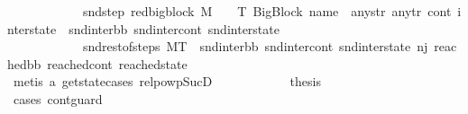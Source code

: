 \begin{isabellebody}
\ \ \ \ \ \ \ \ \ \ \ \ snd{\isacharunderscore}{\kern0pt}step{\isacharcolon}{\kern0pt}\ {\isachardoublequoteopen}red{\isacharunderscore}{\kern0pt}bigblock\ M\ {\isasymLambda}\ {\isasymGamma}\ {\isasymOmega}\ T\ {\isacharparenleft}{\kern0pt}{\isacharparenleft}{\kern0pt}BigBlock\ name\ {\isacharbrackleft}{\kern0pt}{\isacharbrackright}{\kern0pt}\ any{\isacharunderscore}{\kern0pt}str\ any{\isacharunderscore}{\kern0pt}tr{\isacharparenright}{\kern0pt}{\isacharcomma}{\kern0pt}\ cont{}{\isacharcomma}{\kern0pt}\ inter{\isacharunderscore}{\kern0pt}state{\isacharparenright}{\kern0pt}\ \ {\isacharparenleft}{\kern0pt}snd{\isacharunderscore}{\kern0pt}inter{\isacharunderscore}{\kern0pt}bb{\isacharcomma}{\kern0pt}\ snd{\isacharunderscore}{\kern0pt}inter{\isacharunderscore}{\kern0pt}cont{\isacharcomma}{\kern0pt}\ snd{\isacharunderscore}{\kern0pt}inter{\isacharunderscore}{\kern0pt}state{\isacharparenright}{\kern0pt}{\isachardoublequoteclose}\ \isanewline
\ \ \ \ \ \ \ \ \ \ \ \ snd{\isacharunderscore}{\kern0pt}rest{\isacharunderscore}{\kern0pt}of{\isacharunderscore}{\kern0pt}steps{\isacharcolon}{\kern0pt}\ {\isachardoublequoteopen}M{\isacharcomma}{\kern0pt}{\isasymLambda}{\isacharcomma}{\kern0pt}{\isasymGamma}{\isacharcomma}{\kern0pt}{\isasymOmega}{\isacharcomma}{\kern0pt}T\ {\isasymturnstile}\ {\isacharparenleft}{\kern0pt}snd{\isacharunderscore}{\kern0pt}inter{\isacharunderscore}{\kern0pt}bb{\isacharcomma}{\kern0pt}\ snd{\isacharunderscore}{\kern0pt}inter{\isacharunderscore}{\kern0pt}cont{\isacharcomma}{\kern0pt}\ snd{\isacharunderscore}{\kern0pt}inter{\isacharunderscore}{\kern0pt}state{\isacharparenright}{\kern0pt}\ {\isacharminus}{\kern0pt}n{\isasymlongrightarrow}{\isacharcircum}{\kern0pt}j{\isacharprime}{\kern0pt}{\isacharprime}{\kern0pt}\ {\isacharparenleft}{\kern0pt}reached{\isacharunderscore}{\kern0pt}bb{\isacharcomma}{\kern0pt}\ reached{\isacharunderscore}{\kern0pt}cont{\isacharcomma}{\kern0pt}\ reached{\isacharunderscore}{\kern0pt}state{\isacharparenright}{\kern0pt}{\isachardoublequoteclose}\isanewline
\ \ \ \ \ \ \ \ \ \ \ \ \isamarkupfalse%
\ {\isacharparenleft}{\kern0pt}metis\ a{}\ get{\isacharunderscore}{\kern0pt}state{\isachardot}{\kern0pt}cases\ relpowp{\isacharunderscore}{\kern0pt}Suc{\isacharunderscore}{\kern0pt}D{}{\isacharparenright}{\kern0pt}\isanewline
\isanewline
\ \ \ \ \ \ \ \ \ \ \isamarkupfalse%
\ {\isacharquery}{\kern0pt}thesis\ \isanewline
\ \ \ \ \ \ \ \ \ \ \isamarkupfalse%
\ {\isacharparenleft}{\kern0pt}cases\ cont{\isacharunderscore}{\kern0pt}guard{\isacharparenright}{\kern0pt}\isanewline

\end{isabellebody}
